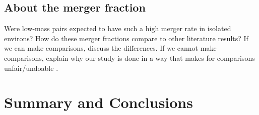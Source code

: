 \documentclass[twocolumn,linenumbers]{aastex631}
\begin{document}
\subsection{About the merger fraction}
Were low-mass pairs expected to have such a high merger rate in isolated environs? 
How do these merger fractions compare to other literature results? 
If we can make comparisons, discuss the differences. 
If we cannot make comparisons, explain why our study is done in a way that makes for comparisons unfair/undoable .



\section{Summary and Conclusions}
\end{document}
